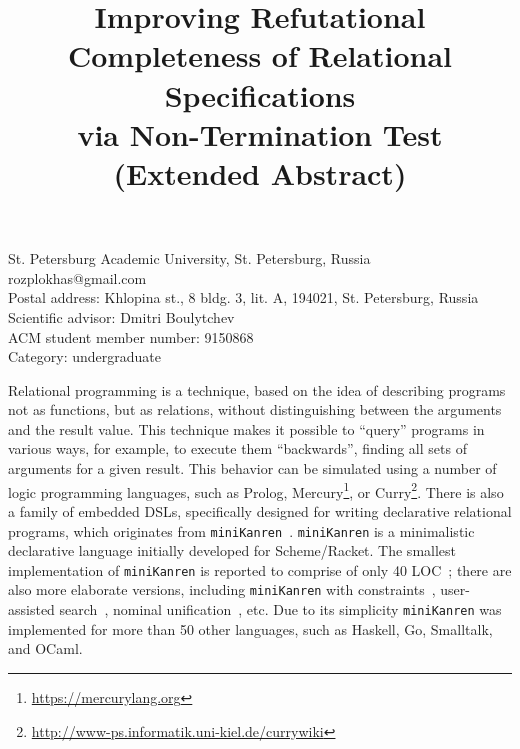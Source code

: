 \documentclass[preprint,numbers,10pt]{sigplanconf}
\newcommand{\miniKanren}{\texttt{miniKanren}\xspace}
\begin{document}

\title{Improving Refutational Completeness of Relational Specifications\\
via Non-Termination Test\\
{\small (Extended Abstract)}}

{St. Petersburg Academic University, St. Petersburg, Russia}
{rozplokhas@gmail.com\\
Postal address: Khlopina st., 8 bldg. 3, lit. A, 194021, St. Petersburg, Russia\\
Scientific advisor: Dmitri Boulytchev\\
ACM student member number: 9150868\\
Category: undergraduate
}


\maketitle


Relational programming is a technique, based on the idea of describing programs not as functions, but 
as relations, without distinguishing between the arguments and the result value. This technique makes it 
possible to ``query'' programs in various ways, for example, to execute them ``backwards'', finding
all sets of arguments for a given result. This behavior can be simulated using a number of
logic programming languages, such as Prolog, Mercury\footnote{\url{https://mercurylang.org}}, 
or Curry\footnote{\url{http://www-ps.informatik.uni-kiel.de/currywiki}}. 
There is also a family of embedded DSLs, specifically designed for writing declarative relational
programs, which originates from \miniKanren~\cite{TRS}. \miniKanren is a minimalistic 
declarative language initially developed for Scheme/Racket. The smallest implementation of \miniKanren 
is reported to comprise of only 40 LOC~\cite{MicroKanren, 2016}; there are also more elaborate versions, including
\miniKanren with constraints~\cite{CKanren, CKanren1}, user-assisted search~\cite{Guided}, nominal unification~\cite{AlphaKanren},
etc. Due to its simplicity \miniKanren was implemented for more than 50 other languages, such as
Haskell, Go, Smalltalk, and OCaml.
\end{document}
